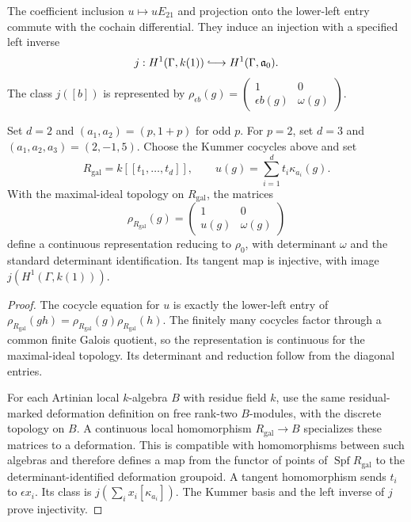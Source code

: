 The coefficient inclusion \(u\mapsto uE_{21}\) and projection onto
the lower-left entry commute with the cochain differential. They induce
an injection with a specified left inverse
\[
 j:H^1(\Gamma,k(1))\lhook\joinrel\longrightarrow H^1(\Gamma,\mathfrak a_0).
\]
The class \(j([b])\) is represented by
\(\rho_{\epsilon b}(g)=\left(\begin{smallmatrix}1&0\\\epsilon b(g)&\omega(g)\end{smallmatrix}\right)\).

\begin{theorem}
\label{v4-arith:local-cyclotomic:formal-family}
Set \(d=2\) and \((a_1,a_2)=(p,1+p)\) for odd \(p\).
For \(p=2\), set \(d=3\) and \((a_1,a_2,a_3)=(2,-1,5)\).
Choose the Kummer cocycles above and set
\[
 R_{\mathrm{gal}}=k[[t_1,\ldots,t_d]],\qquad
 u(g)=\sum_{i=1}^d t_i\kappa_{a_i}(g).
\]
With the maximal-ideal topology on \(R_{\mathrm{gal}}\), the matrices
\[
 \rho_{R_{\mathrm{gal}}}(g)=\begin{pmatrix}1&0\\u(g)&\omega(g)\end{pmatrix}
\]
define a continuous representation reducing to \(\rho_0\), with
determinant \(\omega\) and the standard determinant identification.
Its tangent map is injective, with image \(j(H^1(\Gamma,k(1)))\).
\end{theorem}

\begin{proof}
The cocycle equation for \(u\) is exactly the lower-left entry of
\(\rho_{R_{\mathrm{gal}}}(gh)=\rho_{R_{\mathrm{gal}}}(g)\rho_{R_{\mathrm{gal}}}(h)\).
The finitely many cocycles factor through a common finite Galois quotient,
so the representation is continuous for the maximal-ideal topology.
Its determinant and reduction follow from the diagonal entries.

For each Artinian local \(k\)-algebra \(B\) with residue field \(k\),
use the same residual-marked deformation definition on free rank-two
\(B\)-modules, with the discrete topology on \(B\). A continuous local
homomorphism \(R_{\mathrm{gal}}\to B\) specializes these matrices
to a deformation. This is compatible with homomorphisms between such
algebras and therefore defines a map from the functor of points of
\(\operatorname{Spf}R_{\mathrm{gal}}\) to the determinant-identified deformation groupoid.
A tangent homomorphism sends \(t_i\) to \(\epsilon x_i\).
Its class is \(j(\sum_i x_i[\kappa_{a_i}])\).
The Kummer basis and the left inverse of \(j\) prove injectivity.
\end{proof}

